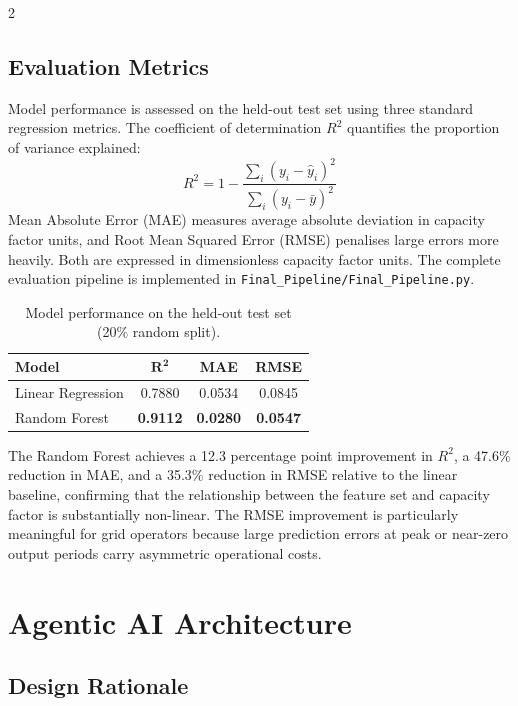 \documentclass[11pt]{article}
\begin{document}
\begin{multicols}{2}
\subsection{Evaluation Metrics}

Model performance is assessed on the held-out test set using three standard
regression metrics. The coefficient of determination $R^2$ quantifies the
proportion of variance explained:
\[
  R^2 = 1 - \frac{\displaystyle\sum_{i}(y_i - \hat{y}_i)^2}
                  {\displaystyle\sum_{i}(y_i - \bar{y})^2}
\]
Mean Absolute Error (MAE) measures average absolute deviation in capacity
factor units, and Root Mean Squared Error (RMSE) penalises large errors more
heavily. Both are expressed in dimensionless capacity factor units. The
complete evaluation pipeline is implemented in
\texttt{Final\_Pipeline/Final\_Pipeline.py}.

\begin{table}[H]
  \centering
  \caption{Model performance on the held-out test set (20\% random split).}
  \label{tab:model_metrics}
  \small
  \begin{tabular}{lccc}
    \toprule
    \textbf{Model} & $\boldsymbol{R^2}$ & \textbf{MAE} & \textbf{RMSE} \\
    \midrule
    Linear Regression  & 0.7880 & 0.0534 & 0.0845 \\
    Random Forest      & \textbf{0.9112} & \textbf{0.0280} & \textbf{0.0547} \\
    \bottomrule
  \end{tabular}
\end{table}

The Random Forest achieves a 12.3 percentage point improvement in $R^2$,
a 47.6\% reduction in MAE, and a 35.3\% reduction in RMSE relative to the
linear baseline, confirming that the relationship between the feature set and
capacity factor is substantially non-linear. The RMSE improvement is
particularly meaningful for grid operators because large prediction errors at
peak or near-zero output periods carry asymmetric operational costs.

\section{Agentic AI Architecture}

\subsection{Design Rationale}


\end{multicols}
\end{document}
